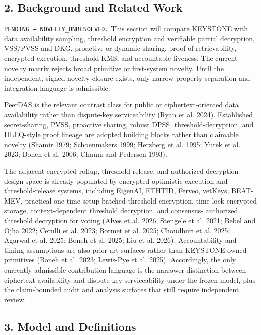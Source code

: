 \documentclass[
]{article}
\begin{document}
\subsection{2. Background and Related
Work}\label{background-and-related-work}

\texttt{PENDING\ —\ NOVELTY\_UNRESOLVED.} This section will compare
KEYSTONE with data availability sampling, threshold encryption and
verifiable partial decryption, VSS/PVSS and DKG, proactive or dynamic
sharing, proof of retrievability, encrypted execution, threshold KMS,
and accountable liveness. The current novelty matrix rejects broad
primitive or first-system novelty. Until the independent, signed novelty
closure exists, only narrow property-separation and integration language
is admissible.

PeerDAS is the relevant contrast class for public or ciphertext-oriented
data availability rather than dispute-key serviceability (Ryan et al.
2024). Established secret-sharing, PVSS, proactive sharing, robust DPSS,
threshold-decryption, and DLEQ-style proof lineage are adopted building
blocks rather than claimable novelty (Shamir 1979; Schoenmakers 1999;
Herzberg et al. 1995; Yurek et al. 2023; Boneh et al. 2006; Chaum and
Pedersen 1993).

The adjacent encrypted-rollup, threshold-release, and
authorized-decryption design space is already populated by encrypted
optimistic-execution and threshold-release systems, including EigenAI,
ETHTID, Ferveo, vetKeys, BEAT-MEV, practical one-time-setup batched
threshold encryption, time-lock encrypted storage, context-dependent
threshold decryption, and consensus- authorized threshold decryption for
voting (Alves et al. 2026; Stengele et al. 2021; Bebel and Ojha 2022;
Cerulli et al. 2023; Bormet et al. 2025; Choudhuri et al. 2025; Agarwal
et al. 2025; Boneh et al. 2025; Liu et al. 2026). Accountability and
timing assumptions are also prior-art surfaces rather than
KEYSTONE-owned primitives (Boneh et al. 2023; Lewis-Pye et al. 2025).
Accordingly, the only currently admissible contribution language is the
narrower distinction between ciphertext availability and dispute-key
serviceability under the frozen model, plus the claim-bounded audit and
analysis surfaces that still require independent review.

\subsection{3. Model and Definitions}\label{model-and-definitions}
\end{document}
